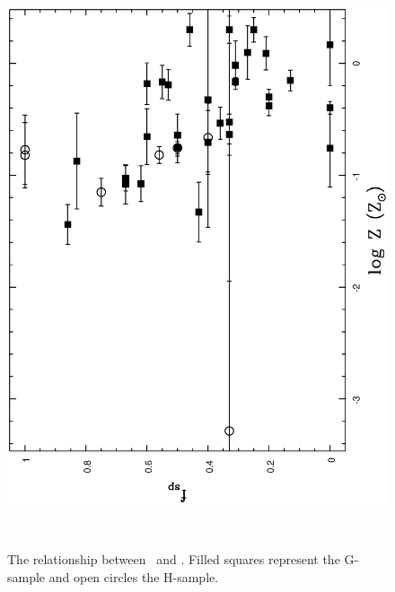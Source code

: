 \documentclass[usenatbib]{mn2e}
\begin{document}
\begin{figure}
\begin{minipage}{241pt}
  \end{minipage}\hspace{18pt}
  \begin{minipage}{241pt}
  \centering

    \includegraphics[height=\linewidth,angle=270]{fig_25.ps}
    \caption{The relationship between \fsp\ and \Z.  Filled squares represent
             the G-sample and open circles the H-sample.}
    \label{fig_fsp_Z}

  \end{minipage}\\
  \begin{minipage}{241pt}


\end{minipage}
\end{figure}
\end{document}
